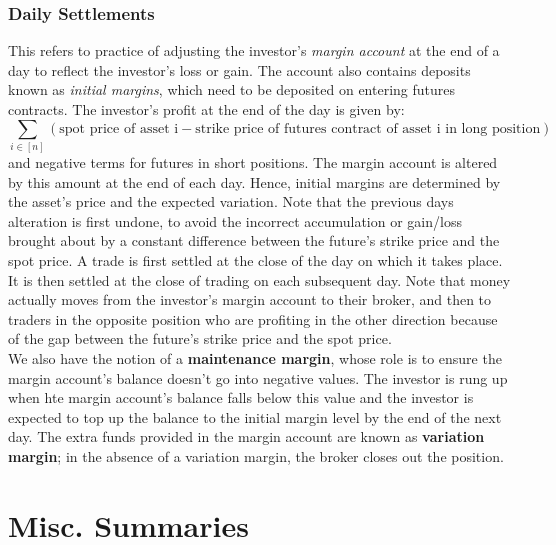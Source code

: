 \documentclass{article}
\begin{document}
\subsubsection*{Daily Settlements}
This refers to practice of adjusting the investor's \emph{margin account} at the end of a day to reflect the investor's 
loss or gain. The account also contains deposits known as \emph{initial margins}, which need to be deposited on entering
futures contracts. The investor's profit at the end of the day is given by:
\begin{equation}
    \sum_{i \in [n]}{(\text{spot price of asset i} - \text{strike price of futures contract of asset i in long position})}
\end{equation}
and negative terms for futures in short positions.
The margin account is altered by this amount at the end of each day. Hence, initial margins are determined by the asset's price
and the expected variation. Note that the previous days alteration is first undone, to avoid the incorrect accumulation
or gain/loss brought about by a constant difference between the future's strike price and the spot price. A trade is first
settled at the close of the day on which it takes place. It is then settled at the
close of trading on each subsequent day. Note that money actually moves from the investor's margin account to their broker,
and then to traders in the opposite position who are profiting in the other direction because of the gap between the future's
strike price and the spot price.\\
We also have the notion of a \textbf{maintenance margin}, whose role is to ensure the margin account's balance doesn't go into 
negative values. The investor is rung up when hte margin account's balance falls below this value and the investor is expected
to top up the balance to the initial margin level by the end of the next day. The extra funds provided in the margin account 
are known as \textbf{variation margin}; in the absence of a variation margin, the broker closes out the position.
\section{Misc. Summaries}
\end{document}
